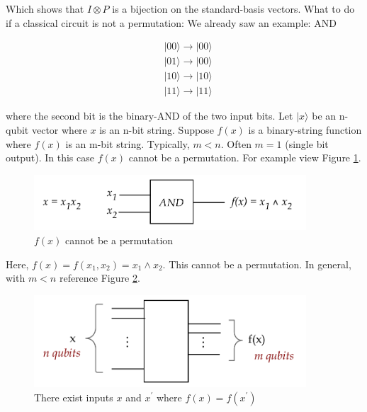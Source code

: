 \documentclass[main.tex]{subfiles}
\begin{document}
    Which shows that $I \otimes P$ is a bijection on the standard-basis vectors. What to do if a classical circuit is not a permutation: We already saw an example: AND
    
    $$
    \begin{aligned}
    &|00\rangle \rightarrow |00\rangle \\
    &|01\rangle \rightarrow |00\rangle \\
    &|10\rangle \rightarrow |10\rangle \\
    &|11\rangle \rightarrow |11\rangle
    \end{aligned}
    $$
    
    where the second bit is the binary-AND of the two input bits. Let $|x\rangle$ be an $\mathrm{n}$-qubit vector where $x$ is an $\mathrm{n}$-bit string. Suppose $f(x)$ is a binary-string function where $f(x)$ is an $\mathrm{m}$-bit string. Typically, $m<n$. Often $m=1$ (single bit output). In this case $f(x)$ cannot be a permutation. For example view Figure \ref{fig:28permutation2}.
    
    \begin{figure}
        \centering
        \includegraphics[width=4in]{notes/figs/n10/28permutation2.png}
        \caption{$f(x)$ cannot be a permutation}
        \label{fig:28permutation2}
    \end{figure}
    
    Here, $f(x)=f\left(x_{1}, x_{2}\right)=x_{1} \wedge x_{2}$. This cannot be a permutation. In general, with $m<n$ reference Figure \ref{fig:29permutation3}.
    
    \begin{figure}
        \centering
        \includegraphics[width=4in]{notes/figs/n10/29permutation3.png}
        \caption{There exist inputs $x$ and $x^{\prime}$ where $f(x)=f\left(x^{\prime}\right)$}
        \label{fig:29permutation3}
    \end{figure}
    
\end{document}
